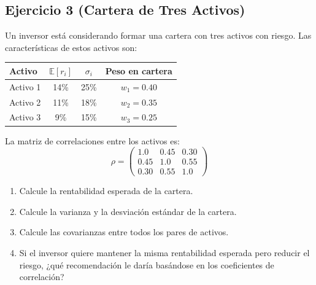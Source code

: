 \documentclass[12pt,a4paper]{article}
\newcommand{\E}{\mathbb{E}}
\newenvironment{ejercicio}[1]{\subsection*{Ejercicio #1}}{}
\begin{document}
\begin{ejercicio}{3 (Cartera de Tres Activos)}
Un inversor está considerando formar una cartera con tres activos con riesgo. Las características de estos activos son:
\begin{center}
\begin{tabular}{lccc}
\toprule
Activo & $\E[r_i]$ & $\sigma_i$ & Peso en cartera \\
\midrule
Activo 1 & 14\% & 25\% & $w_1 = 0.40$ \\
Activo 2 & 11\% & 18\% & $w_2 = 0.35$ \\
Activo 3 & 9\% & 15\% & $w_3 = 0.25$ \\
\bottomrule
\end{tabular}
\end{center}

La matriz de correlaciones entre los activos es:
\[
\rho = \begin{pmatrix}
1.0 & 0.45 & 0.30 \\
0.45 & 1.0 & 0.55 \\
0.30 & 0.55 & 1.0
\end{pmatrix}
\]

\begin{enumerate}[label=\alph*)]
  \item Calcule la rentabilidad esperada de la cartera.
  \item Calcule la varianza y la desviación estándar de la cartera.
  \item Calcule las covarianzas entre todos los pares de activos.
  \item Si el inversor quiere mantener la misma rentabilidad esperada pero reducir el riesgo, ¿qué recomendación le daría basándose en los coeficientes de correlación?
\end{enumerate}
\end{ejercicio}
\end{document}
